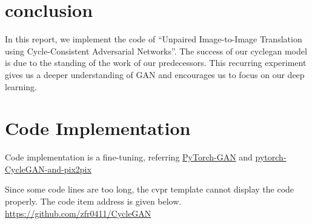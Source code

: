\documentclass[10pt,twocolumn,letterpaper]{article}
\begin{document}
\section{conclusion }

In this report, we implement the code of 
“Unpaired Image-to-Image Translation 
using Cycle-Consistent Adversarial Networks”. 
The success of our cyclegan model is 
due to the standing of the work of our predecessors.
This recurring experiment gives us a deeper 
understanding of GAN and encourages us to focus on our deep learning.



\section{Code Implementation }

Code implementation is a fine-tuning, referring \href{https://github.com/eriklindernoren/PyTorch-GAN}{PyTorch-GAN}
and 
\href{https://github.com/junyanz/pytorch-CycleGAN-and-pix2pix}{pytorch-CycleGAN-and-pix2pix}








Since some code lines are too long, the cvpr template cannot display the code properly. The code item address is given below.	\url{https://github.com/zfr0411/CycleGAN}




{\small


}
\end{document}

